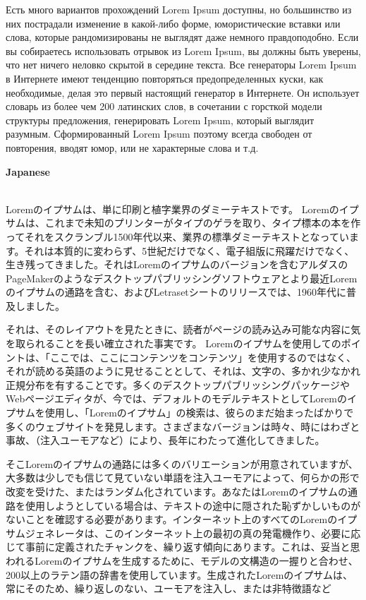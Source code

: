 \documentclass{article}
\begin{document}
Есть много вариантов прохождений Lorem Ipsum доступны, но большинство из них пострадали изменение в какой-либо форме, юмористические вставки или слова, которые рандомизированы не выглядят даже немного правдоподобно. Если вы собираетесь использовать отрывок из Lorem Ipsum, вы должны быть уверены, что нет ничего неловко скрытой в середине текста. Все генераторы Lorem Ipsum в Интернете имеют тенденцию повторяться предопределенных куски, как необходимые, делая это первый настоящий генератор в Интернете. Он использует словарь из более чем 200 латинских слов, в сочетании с горсткой модели структуры предложения, генерировать Lorem Ipsum, который выглядит разумным. Сформированный Lorem Ipsum поэтому всегда свободен от повторения, вводят юмор, или не характерные слова и т.д.\\

\par
\textbf{\huge{}Japanese}\\\\

\par
Loremのイプサムは、単に印刷と植字業界のダミーテキストです。 Loremのイプサムは、これまで未知のプリンターがタイプのゲラを取り、タイプ標本の本を作ってそれをスクランブル1500年代以来、業界の標準ダミーテキストとなっています。それは本質的に変わらず、5世紀だけでなく、電子組版に飛躍だけでなく、生き残ってきました。それはLoremのイプサムのバージョンを含むアルダスのPageMakerのようなデスクトップパブリッシングソフトウェアとより最近Loremのイプサムの通路を含む、およびLetrasetシートのリリースでは、1960年代に普及しました。

それは、そのレイアウトを見たときに、読者がページの読み込み可能な内容に気を取られることを長い確立された事実です。 Loremのイプサムを使用してのポイントは、「ここでは、ここにコンテンツをコンテンツ」を使用するのではなく、それが読める英語のように見せることとして、それは、文字の、多かれ少なかれ正規分布を有することです。多くのデスクトップパブリッシングパッケージやWebページエディタが、今では、デフォルトのモデルテキストとしてLoremのイプサムを使用し、「Loremのイプサム」の検索は、彼らのまだ始まったばかりで多くのウェブサイトを発見します。さまざまなバージョンは時々、時にはわざと事故、（注入ユーモアなど）により、長年にわたって進化してきました。

そこLoremのイプサムの通路には多くのバリエーションが用意されていますが、大多数は少しでも信じて見ていない単語を注入ユーモアによって、何らかの形で改変を受けた、またはランダム化されています。あなたはLoremのイプサムの通路を使用しようとしている場合は、テキストの途中に隠された恥ずかしいものがないことを確認する必要があります。インターネット上のすべてのLoremのイプサムジェネレータは、このインターネット上の最初の真の発電機作り、必要に応じて事前に定義されたチャンクを、繰り返す傾向にあります。これは、妥当と思われるLoremのイプサムを生成するために、モデルの文構造の一握りと合わせ、200以上のラテン語の辞書を使用しています。生成されたLoremのイプサムは、常にそのため、繰り返しのない、ユーモアを注入し、または非特徴語など\\
\end{document}
